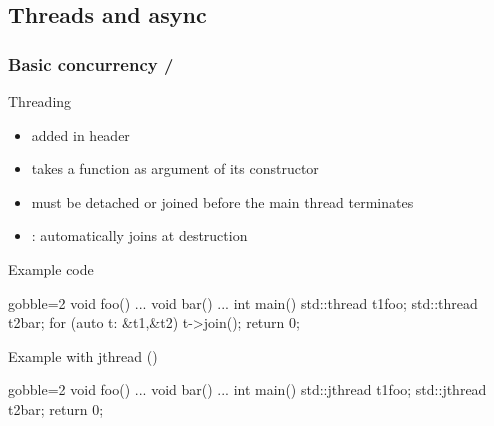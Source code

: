 \subsection[thr]{Threads and async}

\begin{frame}[fragile]
  \frametitle{Basic concurrency \hfill {}/}
  \begin{block}{Threading}
    \begin{itemize}
    \item {} added  in  header
    \item takes a function as argument of its constructor
    \item must be detached or joined before the main thread terminates
    \item {}:  automatically joins at destruction
    \end{itemize}
  \end{block}
  \vspace{-1\baselineskip}
  \begin{overprint}
    \begin{exampleblock}{Example code}
      \begin{cppcode*}{gobble=2}
        void foo() {...}
        void bar() {...}
        int main() {
          std::thread t1{foo};
          std::thread t2{bar};
          for (auto t: {&t1,&t2}) t->join();
          return 0;
        }
      \end{cppcode*}
    \end{exampleblock}
    \begin{exampleblock}{Example with jthread ()}
      \begin{cppcode*}{gobble=2}
        void foo() {...}
        void bar() {...}
        int main() {
          std::jthread t1{foo};
          std::jthread t2{bar};
          return 0;
        }
      \end{cppcode*}
    \end{exampleblock}
  \end{overprint}
\end{frame}

